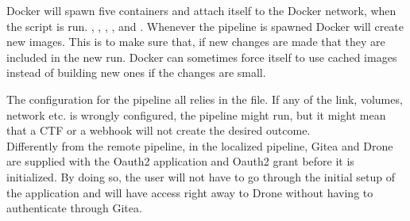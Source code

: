 Docker will spawn five containers and attach itself to the Docker network, when the  script is run.
, , , , and .
Whenever the pipeline is spawned Docker will create new images. This is to make sure that, if new changes are made 
that they are included in the new run. Docker can sometimes force itself to use cached images instead of building new 
ones if the changes are small.

The configuration for the pipeline all relies in the  file. If any of the link, volumes, network etc. 
is wrongly configured, the pipeline might run, but it might mean that a CTF or a webhook will not create the desired outcome.\\
Differently from the remote pipeline, in the localized pipeline, Gitea and Drone are supplied with the Oauth2 application and Oauth2 grant
before it is initialized. 
By doing so, the user will not have to go through the initial setup of the application and will have access 
right away to Drone without having to authenticate through Gitea.

